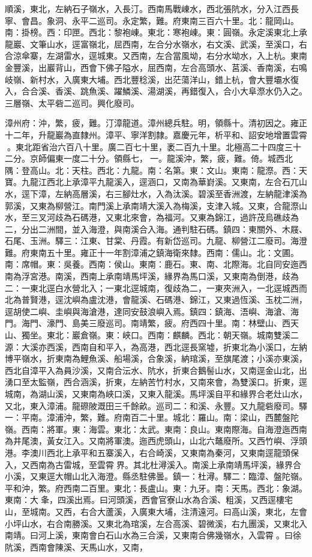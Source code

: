 \begin{pinyinscope}
順溪，東北，左納石子嶺水，入長汀。西南馬戰崠水，西北張阬水，分入江西長寧、會昌。象洞、永平二巡司。永定繁，難。府東南三百六十里。北：龍岡山。南：掛榜。西：印匣。西北：黎袍崠。東北：寒袍崠。東：圓嶺。永定溪東北上承龍巖、文筆山水，逕富嶺北，屈西南，左合分水嶺水，右文溪、武溪，至溪口，右合涼傘寨，左湖雷水，逕城東。又西南，左合當風坳，右分水坳水，入上杭。東南金豐溪，出巖背山，西會下佛子隘水，屈西南，左合高頭水、莒溪、香南溪，右鳴岐嶺、新村水，入廣東大埔。西北豐稔溪，出茫蕩洋山，錯上杭，會大豐壩水復入，合合溪、香溪、跳魚溪、躍鱗溪、湯湖溪，再錯復入，合小大阜漈水仍入之。三層嶺、太平砦二巡司。興化廢司。

漳州府：沖，繁，疲，難。汀漳龍道。漳州總兵駐。明，領縣十。清初因之。雍正十二年，升龍巖為直隸州。漳平、寧洋割隸。嘉慶元年，析平和、詔安地增置雲霄。東北距省治六百八十里。廣二百七十里，袤二百九十里。北極高二十四度三十二分。京師偏東一度二十分。領縣七，一。龍溪沖，繁，疲，難。倚。城西北隅：登高山。北：天柱。西北：九龍。南：名第。東：文山。東南：龍漈。西：天寶。九龍江西北上承漳平九龍溪入，逕涵口，又南為華崶溪。又東南，左合石兀山水，逕下漳，左納高層溪，右三腳灶水，入為汰溪。碧溪至香洲渡，左納龍津溪為郭溪，又東為柳營江。南門溪上承南靖大溪入為梅溪，支津入城。又東，合龍漈山水，至三叉河歧為石碼港，又東北來會，為福河。又東為錦江，過許茂烏礁歧為二，分出二洲間，並入海澄，與南溪合入海。通判駐石碼。鎮四：東關外、木屐、石尾、玉洲。驛三：江東、甘棠、丹霞。有新岱巡司。九龍、柳營江二廢司。海澄難。府東南五十里。雍正十一年割漳浦之鎮海衛來隸。西南：儒山。北：文圃。南：席帽。東：吳養。西南：侯山。東南：鹿石。東、南、北際海。北自同安迤西南為浮宮港。南溪，西南上承南靖馬坪溪，緣界為馬口溪，又東南為倒港，歧為二：一東北逕白水營北入；一東北逕城南，復歧為二，一東夾洲入，一北逕城西而北為普賢港，逕沈嶼為盧沈港，會龍溪、石碼港、錦江，又東過恆溪、玉枕二洲，逕胡使二嶼、圭嶼與海滄港，達同安鼓浪嶼入焉。鎮四：鎮海、浯嶼、海滄、海門。海門、濠門、島美三廢巡司。南靖繁，疲。府西四十里。南：林壁山、西天山、獨坐。東北：巖倉嶺。東：峽口。西南：麒麟。西北：朝天嶺。城南雙溪二源：大溪亦西溪，西南自和平入，為高港，西北逕長窯墟，折東北為小溪口，左納博平嶺水，折東南為鯉魚溪、船場溪，合象溪，納琯溪，至旗尾渡；小溪亦東溪，西北自漳平入為員沙溪，又南合沄水、阬水，折東合鵝髻山水，又南逕金山北，出湧口至太監嶺，西合涵溪，折東，左納苦竹村水，又南來會，為雙溪口。折東，逕城南，為湖山溪，又東南為峽口溪，又東入龍溪。馬坪溪自平和緣界合老灶山水，又北，東入漳浦。龍磜陂溉田三千餘畝。巡司二：和溪、永豐。又九龍砦廢司。驛一：平南。漳浦沖，繁，難。府南百二十里。城北：羅山。南：梁山，西麓盤陀嶺。西南：將軍。東：海雲。東北：太武。東南：良山。東南際海。自海澄迤西南為井尾澳，黃女江入。又南將軍澳。迤西虎頭山，山北六鼇廢所。又西竹嶼、浮頭港。李澳川西北上承平和五寨溪入，右合崎溪，又東南為秦河，又東南逕龍頭保入，又西南為古雷城，至雲霄界。其北杜潯溪入。南溪上承南靖馬坪溪，緣界合小溪，又東逕大帽山北入海澄。縣丞駐佛曇。鎮一：杜潯。驛二：臨漳、盤陀嶺。平和沖，繁。府西南二百里。東北：長盧山。東：九牙。南：天馬。西北：象湖。東南：大夆，四溪出焉。曰河頭溪，西會官寮山水為合溪、粗溪，又西逕樓宅山，至城南。又西，右合大蘆溪，入廣東大埔，注清遠河。曰高山溪，東北，左會小坪山水，右合南勝溪。又東北為琯溪，左合高溪、碧微溪，右九團溪，又東北入南靖。曰河上溪，東南會白石山水為三合溪，又東南合佛幾嶺水，入雲霄。曰徐阬溪，西南會陳溪、天馬山水，又南，
\end{pinyinscope}
